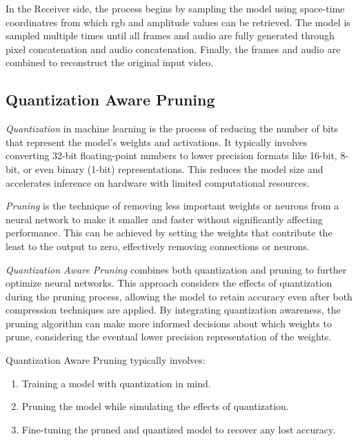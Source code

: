 \documentclass{ioereport}
\begin{document}
    In the Receiver side, the process begins by sampling the model using space-time coordinatres from which \gls{rgb} and amplitude values can be retrieved. The model is sampled multiple times until all frames and audio are fully generated through pixel concatenation and audio concatenation. Finally, the frames and audio are combined to reconstruct the original input video.

    \subsection{Quantization Aware Pruning}
    \textit{Quantization} in machine learning is the process of reducing the number of bits that represent the model's weights and activations. It typically involves converting 32-bit floating-point numbers to lower precision formats like 16-bit, 8-bit, or even binary (1-bit) representations. This reduces the model size and accelerates inference on hardware with limited computational resources.

    \textit{Pruning} is the technique of removing less important weights or neurons from a neural network to make it smaller and faster without significantly affecting performance. This can be achieved by setting the weights that contribute the least to the output to zero, effectively removing connections or neurons.

    \textit{Quantization Aware Pruning} combines both quantization and pruning to further optimize neural networks. This approach considers the effects of quantization during the pruning process, allowing the model to retain accuracy even after both compression techniques are applied. By integrating quantization awareness, the pruning algorithm can make more informed decisions about which weights to prune, considering the eventual lower precision representation of the weights.

    Quantization Aware Pruning typically involves:
    \begin{enumerate}[label=\textbf{\roman*.}]
        \item Training a model with quantization in mind.
        \item Pruning the model while simulating the effects of quantization.
        \item Fine-tuning the pruned and quantized model to recover any lost accuracy.
    \end{enumerate}
\end{document}
